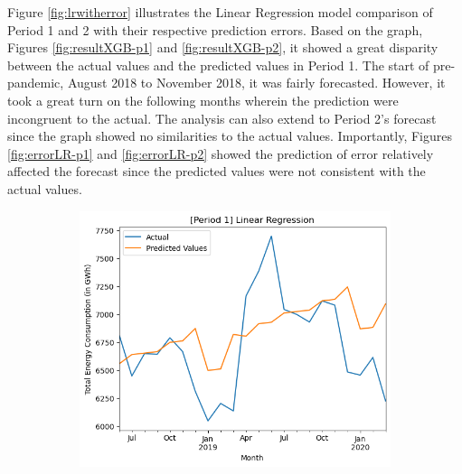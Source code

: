 \documentclass[runningheads]{llncs}
\begin{document}
Figure \ref{fig:lrwitherror} illustrates the Linear Regression model comparison of Period 1 and 2 with their respective prediction errors. Based on the graph, Figures \ref{fig:resultXGB-p1} and \ref{fig:resultXGB-p2}, it showed a great disparity between the actual values and the predicted values in Period 1. The start of pre-pandemic, August 2018 to November 2018, it was fairly forecasted. However, it took a great turn on the following months wherein the prediction were incongruent to the actual. The analysis can also extend to Period 2's forecast since the graph showed no similarities to the actual values. Importantly, Figures \ref{fig:errorLR-p1} and \ref{fig:errorLR-p2} showed the prediction of error relatively affected the forecast since the predicted values were not consistent with the actual values.
\begin{center}
    \begin{figure}[h]
    \begin{subfigure}[h]{0.6\textwidth}
         \centering
         \hspace*{-1.3in}
         \includegraphics[width=\textwidth]{results/lr/p1.png}
         \caption{}
         \label{fig:resultLR-p1}
    \end{subfigure}
    \begin{subfigure}[h]{0.6\textwidth}
         \centering
         \hspace*{-1.3in}

\end{subfigure}
\end{figure}
\end{center}
\end{document}
